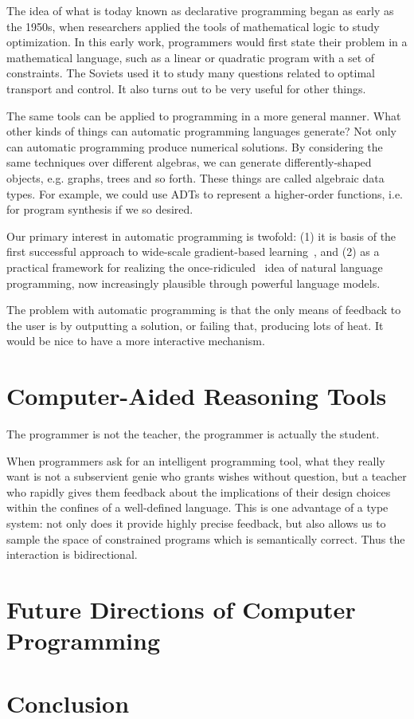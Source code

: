 \documentclass[10pt]{article}
\begin{document}
The idea of what is today known as declarative programming began as early as the 1950s, when researchers applied the tools of mathematical logic to study optimization. In this early work, programmers would first state their problem in a mathematical language, such as a linear or quadratic program with a set of constraints. The Soviets used it to study many questions related to optimal transport and control. It also turns out to be very useful for other things.

The same tools can be applied to programming in a more general manner. What other kinds of things can automatic programming languages generate? Not only can automatic programming produce numerical solutions. By considering the same techniques over different algebras, we can generate differently-shaped objects, e.g. graphs, trees and so forth. These things are called algebraic data types. For example, we could use ADTs to represent a higher-order functions, i.e. for program synthesis if we so desired.

Our primary interest in automatic programming is twofold: (1) it is basis of the first successful approach to wide-scale gradient-based learning~\cite{baydin2018automatic}, and (2) as a practical framework for realizing the once-ridiculed~\cite{dijkstra1979foolishness} idea of natural language programming, now increasingly plausible through powerful language models.

The problem with automatic programming is that the only means of feedback to the user is by outputting a solution, or failing that, producing lots of heat. It would be nice to have a more interactive mechanism.

  \section{Computer-Aided Reasoning Tools}\label{sec:computer-aided-reasoning-tools}

  The programmer is not the teacher, the programmer is actually the student.

When programmers ask for an intelligent programming tool, what they really want is not a subservient genie who grants wishes without question, but a teacher who rapidly gives them feedback about the implications of their design choices within the confines of a well-defined language. This is one advantage of a type system: not only does it provide highly precise feedback, but also allows us to sample the space of constrained programs which is semantically correct. Thus the interaction is bidirectional.

  \section{Future Directions of Computer Programming}

  \section{Conclusion}

  
  
\end{document}
